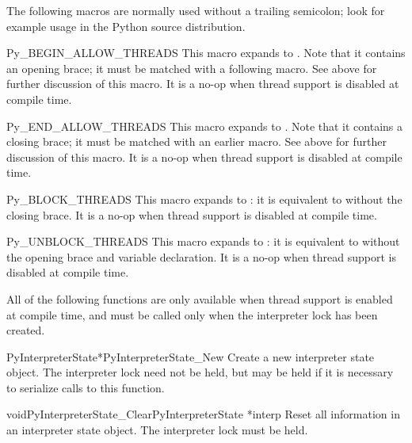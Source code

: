 The following macros are normally used without a trailing semicolon;
look for example usage in the Python source distribution.

\begin{csimplemacrodesc}{Py_BEGIN_ALLOW_THREADS}
  This macro expands to
  .
  Note that it contains an opening brace; it must be matched with a
  following  macro.  See above for
  further discussion of this macro.  It is a no-op when thread support
  is disabled at compile time.
\end{csimplemacrodesc}

\begin{csimplemacrodesc}{Py_END_ALLOW_THREADS}
  This macro expands to .
  Note that it contains a closing brace; it must be matched with an
  earlier  macro.  See above for
  further discussion of this macro.  It is a no-op when thread support
  is disabled at compile time.
\end{csimplemacrodesc}

\begin{csimplemacrodesc}{Py_BLOCK_THREADS}
  This macro expands to : it is
  equivalent to  without the
  closing brace.  It is a no-op when thread support is disabled at
  compile time.
\end{csimplemacrodesc}

\begin{csimplemacrodesc}{Py_UNBLOCK_THREADS}
  This macro expands to : it is
  equivalent to  without the
  opening brace and variable declaration.  It is a no-op when thread
  support is disabled at compile time.
\end{csimplemacrodesc}

All of the following functions are only available when thread support
is enabled at compile time, and must be called only when the
interpreter lock has been created.

\begin{cfuncdesc}{PyInterpreterState*}{PyInterpreterState_New}{}
  Create a new interpreter state object.  The interpreter lock need
  not be held, but may be held if it is necessary to serialize calls
  to this function.
\end{cfuncdesc}

\begin{cfuncdesc}{void}{PyInterpreterState_Clear}{PyInterpreterState *interp}
  Reset all information in an interpreter state object.  The
  interpreter lock must be held.
\end{cfuncdesc}

